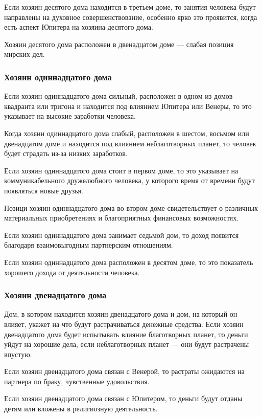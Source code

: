 Если хозяин десятого дома находится в третьем доме, то занятия человека будут направлены на духовное совершенствование, особенно ярко это проявится, когда есть аспект Юпитера на хозяина десятого дома.

Хозяин десятого дома расположен в двенадцатом доме --- слабая позиция мирских дел.


\subsubsection*{Хозяин одиннадцатого дома}
Если хозяин одиннадцатого дома сильный, расположен в одном из домов квадранта или тригона и находится под влиянием Юпитера или Венеры, то это указывает на высокие заработки человека.

Когда хозяин одиннадцатого дома слабый, расположен в шестом, восьмом или двенадцатом доме и находится под влиянием неблаготворных планет, то человек будет страдать из-за низких заработков.

Если хозяин одиннадцатого дома стоит в первом доме, то это указывает на коммуникабельного дружелюбного человека, у которого время от времени будут появляться новые друзья.

Позици хозяин одиннадцатого дома во втором доме свидетельствует о различных материальных приобретениях и благоприятных финансовых возможностях.

Если хозяин одиннадцатого дома занимает седьмой дом, то доход появится благодаря взаимовыгодным партнерским отношениям.

Если хозяин одиннадцатого дома расположен в десятом доме, то это показатель хорошего дохода от деятельности человека.


\subsubsection*{Хозяин двенадцатого дома}
Дом, в котором находится хозяин двенадцатого дома и дом, на который он влияет, укажет на что будут растрачиваться денежные средства. Если хозяин двенадцатого дома будет испытывать влияние благотворных планет, то деньги уйдут на хорошие дела, если неблаготворных планет --- они будут растрачены впустую.

Если хозяин двенадцатого дома связан с Венерой, то растраты ожидаются на партнера по браку, чувственные удовольствия.

Если хозяин двенадцатого дома связан с Юпитером, то деньги будут отданы детям или вложены в религиозную деятельность.

